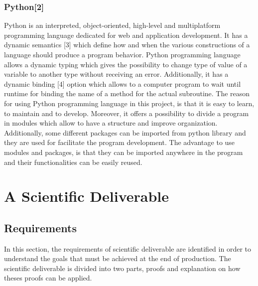 \documentclass[conference,compsoc]{IEEEtran}
\begin{document}
\subsubsection{Python[2]}
Python is an interpreted, object-oriented, high-level and multiplatform programming language dedicated for web and application development. It has a dynamic semantics [3] which define how and when the various constructions of a language should produce a program behavior.         
\newline                                                                                                                                         
 Python programming language allows a dynamic typing which gives the possibility to change type of value of a variable to another type without receiving an error. Additionally, it has a dynamic binding [4] option which allows to a computer program to wait until runtime for binding the name of a method for the actual subroutine.      
\newline                                                                                                                                   
The reason for using Python programming language in this project, is that it is easy to learn, to maintain and to develop. Moreover, it offers a possibility to divide a program in modules which allow to have a structure and improve organization. Additionally, some different packages can be imported from python library and they are used for facilitate the program development. 
\newline
The advantage to use modules and packages, is that they can be imported anywhere in the program and their functionalities can be easily reused. 

\section{ A Scientific Deliverable}
\label{sec-production}
\subsection{Requirements}
In this section, the requirements of scientific deliverable are identified in order to understand the goals that must be achieved at the end of production. The scientific deliverable is divided into two parts, proofs and explanation on how theses proofs can be applied. 
\end{document}
